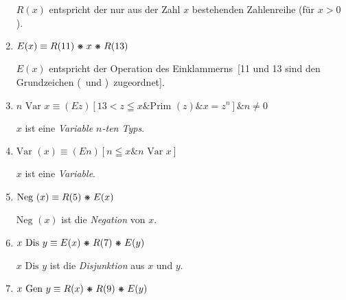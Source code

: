 \documentclass[draft]{scrartcl}
\begin{document}
\begin{enumerate}[1.]
	$R\left(x\right)$ entspricht der nur aus der Zahl $x$ bestehenden Zahlenreihe (für $x > 0$).

	\item {} $E\left(x\right) \equiv R\left(11\right) \pmstar x \pmstar R\left(13\right)$

	$E\left(x\right)$ entspricht der Operation des \glqq Einklammerns\grqq\ [11 und 13 sind den Grundzeichen
	\glqq(\grqq\ und \glqq)\grqq\ zugeordnet].

	\item {}$n\text{ Var } x \equiv \left(Ez\right)\left[13 < z \leqq x \& \text{Prim }\left(z\right) \& x = z^n\right] \& n \not = 0$%

	$x$ ist eine \textit{Variable $n$-ten Typs}.

	\item $\text{Var }\left(x\right) \equiv \left(En\right)\left[n \leqq x \& n \text{ Var } x\right]$%

	$x$ ist eine \textit{Variable}.

	\item {} $\text{Neg }\left(x\right) \equiv R\left(5\right) \pmstar E\left(x\right)$

	$\text{Neg }\left(x\right)$ ist die \textit{Negation} von
	$x$.

	\item {}$x \text{ Dis } y \equiv E\left(x\right) \pmstar R\left(7\right) \pmstar E\left(y\right)$%

	$x \text{ Dis } y$ ist die \textit{Disjunktion} aus $x$ und $y$.

	\item {} $x \text{ Gen } y \equiv R\left(x\right) \pmstar R\left(9\right) \pmstar E\left(y\right)$%


\end{enumerate}
\end{document}
